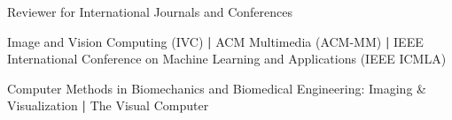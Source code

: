 \vspace{-0.2cm}
\begin{cventries}

 \cventry
    {} %
    {Reviewer for International Journals and Conferences} %
    {} %
    {} %
    {\vspace{-1.6em}
      \begin{cvitems} %
        \item {Image and Vision Computing (IVC)}
       \textbf{|} {ACM Multimedia (ACM-MM)}
        \textbf{|} {IEEE International Conference on Machine Learning and Applications (IEEE ICMLA)}
        \item {Computer Methods in Biomechanics and Biomedical Engineering: Imaging \& Visualization} 
        \textbf{|} The Visual Computer
      \end{cvitems}
    }
\end{cventries}
